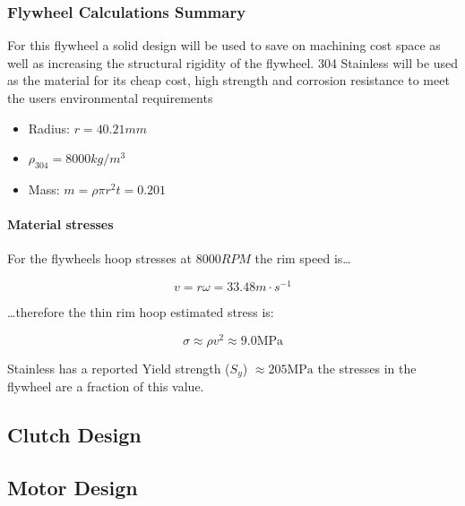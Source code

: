 \documentclass[a4paper,10pt]{article} %
\begin{document}
\newpage

\subsubsection{Flywheel Calculations Summary}

For this flywheel a solid design will be used to save on machining cost space as well as increasing the structural rigidity of the flywheel. 304 Stainless will be used as the material for its cheap cost, high strength and corrosion resistance to meet the users environmental requirements

\begin{itemize}
    \item Radius: $r = 40.21mm$
    \item $\rho_{304} = 8000kg/m^3$
    \item Mass: $m = \rho \pi r^2 t = 0.201$
\end{itemize}

\paragraph{Material stresses}

For the flywheels hoop stresses at $8000RPM$ the rim speed is\ldots

\begin{equation}
    v = r\omega = 33.48m \cdot s^{-1}
\end{equation}

\ldots therefore the thin rim hoop estimated stress is:

\begin{equation}
    \sigma \approx \rho v^2 \approx 9.0\text{MPa}
\end{equation}

 Stainless has a reported Yield strength ($S_y$) $\approx 205\text{MPa}$ \textcite{DMConsultancy304} the stresses in the flywheel are a fraction of this value.

\newpage

\subsection{Clutch Design}


\newpage

\subsection{Motor Design}
\end{document}
